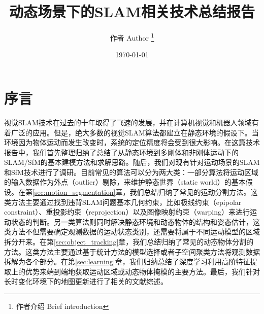 \documentclass[12pt,a4paper]{article}
\title{动态场景下的SLAM相关技术总结报告}
\author{ 作者 Author \thanks{作者介绍 Brief introduction} }
\date{\today}
\begin{document}

\maketitle
\section{序言}
\label{sec:preliminaries}
视觉SLAM技术在过去的十年取得了飞速的发展，并在计算机视觉和机器人领域有着广泛的应用。但是，绝大多数的视觉SLAM算法都建立在静态环境的假设下。当环境因为物体运动而发生改变时，系统的定位精度将会受到很大影响。在这篇技术报告中，我们首先整理归纳了总结了从静态环境到多刚体和非刚体运动下的SLAM/SfM的基本建模方法和求解思路。随后，我们对现有针对运动场景的SLAM和SfM技术进行了调研。目前常见的算法可以分为两大类：一部分算法将运动区域的输入数据作为外点（outlier）剔除，来维护静态世界（static world）的基本假设。在第\ref{sec:motion_segmentation}章，我们总结归纳了常见的运动分割方法。这类方法主要通过找到违背SLAM问题基本几何约束，比如极线约束（epipolar constraint）、重投影约束（reprojection）以及图像映射约束（warping）来进行运动状态的判断。另一类算法则同时解决静态环境和动态物体的结构和姿态估计，这类方法不但需要确定观测数据的运动状态类别，还需要将属于不同运动模型的区域拆分开来。在第\ref{sec:object_tracking}章，我们总结归纳了常见的动态物体分割的方法。这类方法主要通过基于统计方法的模型选择或者子空间聚类方法将观测数据拆解为各个部分。在第\ref{sec:learning}章，我们归纳总结了深度学习利用高阶特征提取上的优势来端到端地获取运动区域或动态物体掩模的主要方法。最后，我们针对长时变化环境下的地图更新进行了相关的文献综述。
%
%
%
%


%
%
%



	
\end{document}
